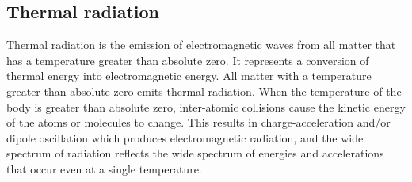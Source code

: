 %
%
%
%
%
%
%


\subsection{Thermal radiation}
Thermal radiation is the emission of electromagnetic waves from all matter that has a temperature greater than absolute zero.
It represents a conversion of thermal energy into electromagnetic energy.
All matter with a temperature greater than absolute zero emits thermal radiation. When the temperature of the body is greater than absolute zero, inter-atomic collisions cause the kinetic energy of the atoms or molecules to change. This results in charge-acceleration and/or dipole oscillation which produces electromagnetic radiation, and the wide spectrum of radiation reflects the wide spectrum of energies and accelerations that occur even at a single temperature.

